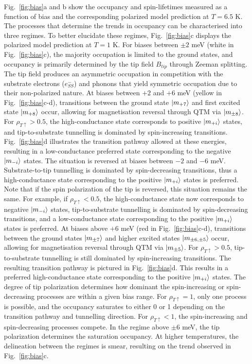 \documentclass[
reprint,amsmath,amssymb,aps]{revtex4-2}
\begin{document}
Fig.~\ref{fig:bias}a and b show the occupancy and spin-lifetimes measured as a function of bias and the corresponding polarized model prediction at $T=6.5$ K. The processes that determine the trends in occupancy can be characterised into three regimes. To better elucidate these regimes, Fig.~\ref{fig:bias}c displays the polarized model prediction at $T=1$ K. For biases between $\pm 2$ meV (white in Fig.~\ref{fig:bias}c), the majority occupation is limited to the ground states, and occupancy is primarily determined by the tip field $B_{tip}$ through Zeeman splitting. The tip field produces an asymmetric occupation in competition with the substrate electrons ($e^{-}_{SS}$) and phonons that yield symmetric occupation due to their non-polarized nature. At biases between $+2$  and $+6$ meV (yellow in Fig.~\ref{fig:bias}c-d), transitions between the ground state $\ket{m_{+7}}$ and first excited state $\ket{m_{+8}}$ occur, allowing for magnetisation reversal through QTM via $\ket{m_{\pm 8}}$. For $\rho_{T \uparrow} > 0.5 $, the high-conductance state corresponds to positive $\ket{m_{+i}}$ states, and tip-to-substrate tunnelling is dominated by spin-increasing transitions. Fig.~\ref{fig:bias}d illustrates the transition pathway allowed at these energies, resulting in a low-conductance preferred state corresponding to the negative $\ket{m_{-i}}$ states. The situation is reversed at biases between $-2$  and $-6$ meV. Substrate-to-tip tunnelling is dominated by spin-decreasing transitions, thus a high-conductance state corresponding to the positive $\ket{m_{+i}}$ states is preferred. 
Note that if the spin polarization of the tip is reversed, this situation remains the same. For example, if $\rho_{T \uparrow} < 0.5 $, the high-conductance state now corresponds to negative $\ket{m_{-i}}$ states, tip-to-substrate tunnelling is dominated by spin-decreasing transitions, and a low-conductance state corresponding to the positive $\ket{m_{+i}}$ states is preferred. At biases above $+6$ meV (red in Fig.~\ref{fig:bias}c-d), transitions between the ground states $\ket{m_{\pm7}}$ and higher excited states $\ket{m_{\pm 6, \pm 5}}$ occur, allowing for magnetisation reversal through QTM via $\ket{m_{\pm 5}}$. For $\rho_{T \uparrow} > 0.5 $, tip-to-substrate tunnelling is still dominated by spin-increasing transitions. The resulting transition pathway is pictured in Fig.~\ref{fig:bias}d. This results in a preferred high-conductance state corresponding to the positive $\ket{m_{+i}}$ states. The degree of tip polarization determines how dominant the spin-increasing or spin-decreasing processes are within a given bias range. For $\rho_{T \uparrow} = 1$, only one process is possible, and the occupancy saturates to either 0 or 1 depending on the transition pathway and tunnelling direction. For $\rho_{T \uparrow} < 1$, the spin-increasing and spin-decreasing processes compete. In the regime above $\pm 6$ meV, the tip polarization determines the saturation occupancy. At higher temperatures, the delineation between the regimes is smear, resulting on the trend observed in Fig.~\ref{fig:bias}c. 
\end{document}
